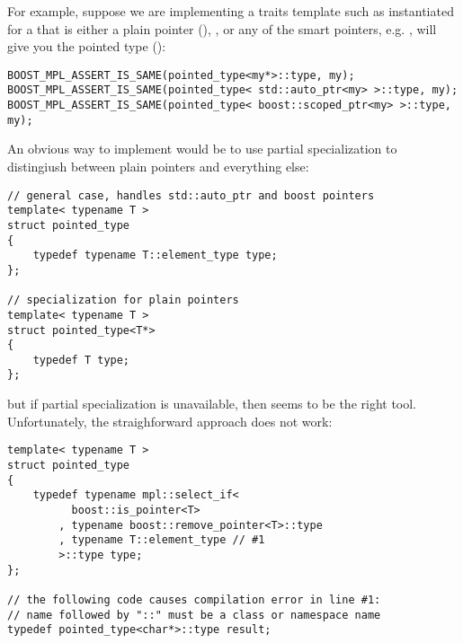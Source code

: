 \documentclass{netobjectdays}
\begin{document}

For example, suppose we are implementing a 
traits template such as  instantiated
for a  that is either a plain pointer
(), , or any of the 
smart pointers, e.g. , will give you 
the pointed type ():

{\footnotesize
\begin{verbatim}
BOOST_MPL_ASSERT_IS_SAME(pointed_type<my*>::type, my);
BOOST_MPL_ASSERT_IS_SAME(pointed_type< std::auto_ptr<my> >::type, my);
BOOST_MPL_ASSERT_IS_SAME(pointed_type< boost::scoped_ptr<my> >::type, my);
\end{verbatim}
}

An obvious way to implement  would be to 
use partial specialization to distingiush between plain 
pointers and everything else:

{\footnotesize
\begin{verbatim}
// general case, handles std::auto_ptr and boost pointers
template< typename T >
struct pointed_type
{
    typedef typename T::element_type type;
};

// specialization for plain pointers
template< typename T >
struct pointed_type<T*>
{
    typedef T type;
};
\end{verbatim}
}

but if partial specialization is unavailable, then 
 seems to be the right tool. Unfortunately,
the straighforward approach does not work:

{\footnotesize
\begin{verbatim}
template< typename T >
struct pointed_type
{
    typedef typename mpl::select_if<
          boost::is_pointer<T>
        , typename boost::remove_pointer<T>::type
        , typename T::element_type // #1
        >::type type;
};

// the following code causes compilation error in line #1:
// name followed by "::" must be a class or namespace name
typedef pointed_type<char*>::type result;
\end{verbatim}
}
\end{document}
